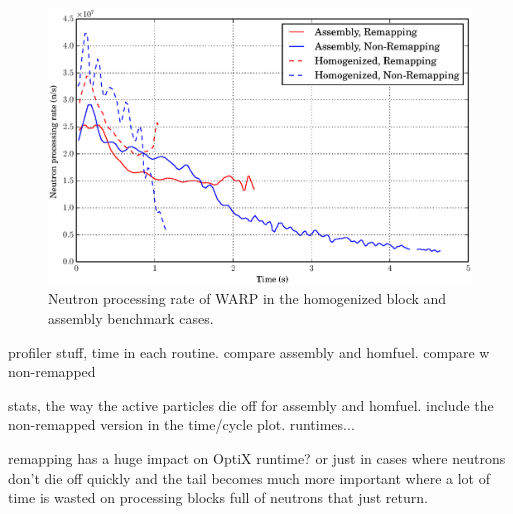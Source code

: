\begin{figure}[h!]
\centering
\includegraphics[width=\textwidth]{graphics/finalresults/process_rate.eps}
\caption{Neutron processing rate of WARP in the homogenized block and assembly benchmark cases. \label{process_rate} }
\end{figure}

profiler stuff, time in each routine.  compare assembly and homfuel.  compare w non-remapped

stats, the way the active particles die off for assembly and homfuel.  include the non-remapped version in the time/cycle plot.  runtimes...

remapping has a huge impact on OptiX runtime?  or just in cases where neutrons don't die off quickly and the tail becomes much more important where a lot of time is wasted on processing blocks full of neutrons that just return.




